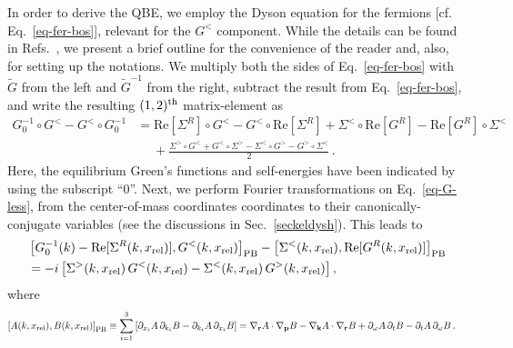 \documentclass[aps, prb, onecolumn, nofootinbib, citeautoscript, 10pt]{revtex4-2}
\def \nn{\nonumber \\}
\begin{document}
In order to derive the QBE, we employ the Dyson equation for the fermions [cf. Eq.~\eqref{eq-fer-bos}], relevant for the $G^<$ component. While the details can be found in Refs.~\cite{kim_qbe, prange, ips-kazi, ips-zero-mode}, we present a brief outline for the convenience of the reader and, also, for setting up the notations. We multiply both the sides of Eq.~\eqref{eq-fer-bos} with $\tilde{G}$ from the left and $\tilde{G}^{-1}$ from the right, subtract the result from Eq.~\eqref{eq-fer-bos}, and write the resulting $(1,2)^{\rm th}$ matrix-element as  
\begin{align}
	G_0^{-1}\circ G^<-G^<\circ G_0^{-1} & = 
	\text{Re}[\Sigma^R] \circ G^<-G^<\circ \text{Re}[\Sigma^R]  
	+  \Sigma^<\circ \text{Re}[G^R]-\text{Re} [G^R] \circ \Sigma^<
	\nn & \;\quad 
	+  \frac{  \Sigma^>\circ G^< 
		+ G^<\circ \Sigma^>-\Sigma^<\circ G^>-G^>\circ \Sigma^< } {2}\,.
	\label{eq-G-less}
\end{align}
Here, the equilibrium Green's functions and self-energies have been indicated by using the subscript ``$0$''. Next, we perform Fourier transformations on Eq.~\eqref{eq-G-less}, from the center-of-mass coordinates coordinates to their canonically-conjugate variables (see the discussions in Sec.~\ref{seckeldysh}). This leads to
\begin{align}
	&   \left[G_0^{-1}(k)-\text{Re}[\Sigma^R ( k, x_{\rm rel}) ], G^< ( k, x_{\rm rel}) \right]_{\text{PB}}
	- \left[\Sigma^< ( k, x_{\rm rel}) ,\text{Re}[G^R ( k, x_{\rm rel}) ] \right]_{\text{PB}}
	\nn &    =
	-i \left[ \Sigma^> ( k, x_{\rm rel})  \,G^< ( k, x_{\rm rel})   
	- \Sigma^< ( k, x_{\rm rel})  \, G^> ( k, x_{\rm rel}) \right ], 
	\label{{eq-G-wt}}
\end{align}
where \begin{align}
	\left[A ( k, x_{\rm rel}) , B ( k, x_{\rm rel}) \right]_{\text{PB}} & \equiv
	\sum_{i=1}^3 \left [   \partial_{x_i} A\, \partial_{k_i} B 
	- \partial_{ k_i} A\, \partial_{x_i} B \right ]
	= \nabla_{\mathbf r } A\cdot \nabla_{\mathbf p }  B
	- \nabla_{\mathbf k } A \cdot \nabla_{\mathbf r }  B
	+ \partial_\omega A \, \partial_t B
	- \partial_t A \, \partial_\omega B \,.
	\label{eqPB}
\end{align}
\end{document}
